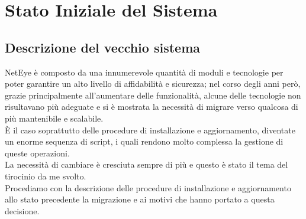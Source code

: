 \chapter{Stato Iniziale del Sistema}
\label{cha:stato_iniziale}

\section{Descrizione del vecchio sistema}
\label{sec:vecchio_sistema} NetEye è composto da una innumerevole quantità di
moduli e tecnologie per poter garantire un alto livello di affidabilità e
sicurezza; nel corso degli anni però, grazie principalmente all'aumentare delle
funzionalità, alcune delle tecnologie non risultavano più adeguate e si è mostrata
la necessità di migrare verso qualcosa di più mantenibile e scalabile.\\ È il caso
soprattutto delle procedure di installazione e aggiornamento, diventate un
enorme sequenza di script, i quali rendono molto complessa la gestione di queste
operazioni.\\ La necessità di cambiare è cresciuta sempre di più e questo è stato
il tema del tirocinio da me svolto.\\ Procediamo con la descrizione delle procedure
di installazione e aggiornamento allo stato precedente la migrazione e ai motivi
che hanno portato a questa decisione.

